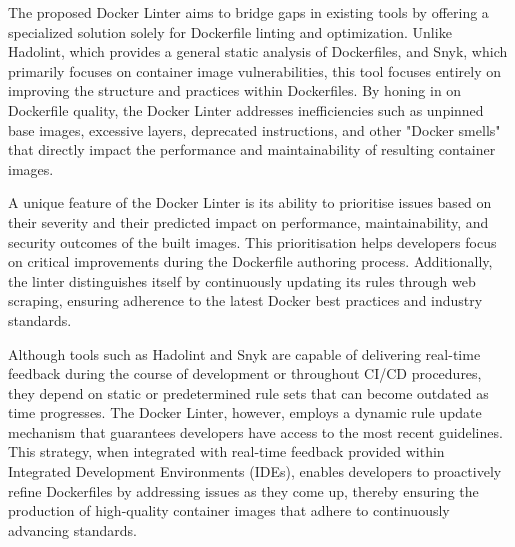 The proposed Docker Linter aims to bridge gaps in existing tools by offering a specialized solution solely for Dockerfile linting and optimization. Unlike Hadolint, which provides a general static analysis of Dockerfiles, and Snyk, which primarily focuses on container image vulnerabilities, this tool focuses entirely on improving the structure and practices within Dockerfiles. By honing in on Dockerfile quality, the Docker Linter addresses inefficiencies such as unpinned base images, excessive layers, deprecated instructions, and other "Docker smells" that directly impact the performance and maintainability of resulting container images.

A unique feature of the Docker Linter is its ability to prioritise issues based on their severity and their predicted impact on performance, maintainability, and security outcomes of the built images. This prioritisation helps developers focus on critical improvements during the Dockerfile authoring process. Additionally, the linter distinguishes itself by continuously updating its rules through web scraping, ensuring adherence to the latest Docker best practices and industry standards.

Although tools such as Hadolint and Snyk are capable of delivering real-time feedback during the course of development or throughout CI/CD procedures, they depend on static or predetermined rule sets that can become outdated as time progresses. The Docker Linter, however, employs a dynamic rule update mechanism that guarantees developers have access to the most recent guidelines. This strategy, when integrated with real-time feedback provided within Integrated Development Environments (IDEs), enables developers to proactively refine Dockerfiles by addressing issues as they come up, thereby ensuring the production of high-quality container images that adhere to continuously advancing standards.

